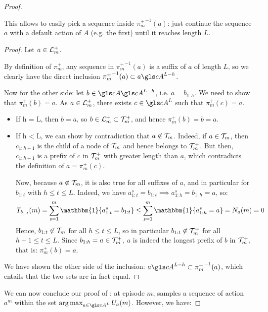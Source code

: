 \begin{subappendices}
\begin{proof}
\begin{lemma}
\begin{leftbar}[lemmabar]
		This allows to easily pick a sequence inside ${\pi_m^+}^{-1}(a)$: just continue the sequence $a$ with a default action of $A$ (e.g. the first) until it reaches length $L$.
		\end{leftbar}
	\end{lemma}
	\begin{proof}
		Let $a\in \mathcal{L}_m^+$. 
		
		By definition of $\pi_m^+$, any sequence in ${\pi_m^+}^{-1}(a)$ is a suffix of $a$ of length $L$, so we clearly have the direct inclusion ${\pi_m^+}^{-1}(a) \subset a \cA^{L-h}$.
		
		Now for the other side: let $b\in \cA \cA^{L-h}$, i.e. $a=b_{1:h}$. We need to show that $\pi_m^+(b) = a$.
		As $a\in \mathcal{L}_m^+$, there exists $c\in \cA^L$ such that $\pi_m^+(c) = a$.
		\begin{itemize}
			\item If h = L, then $b=a$, so $b \in \mathcal{L}_m^+ \subset \mathcal{T}_m^+$, and hence $\pi_m^+(b)=b=a$.
			\item If h < L, we can show by contradiction that $a \not \in \mathcal{T}_m$. Indeed, if $a \in \mathcal{T}_m$, then $c_{1:h+1}$ is the child of a node of $\mathcal{T}_m$ and hence belongs to $\mathcal{T}_m^+$. But then, $c_{1:h+1}$ is a prefix of $c$ in $\mathcal{T}_m^+$ with greater length than $a$, which contradicts the definition of $a = \pi_m^+(c)$.
			
			Now, because $a \not \in \mathcal{T}_m$, it is also true for all suffixes of $a$, and in particular for $b_{1:t}$ with $h \leq t \leq L$. Indeed, we have $a^s_{1:t} = b_{1:t} \implies a^s_{1:h} = b_{1:h} = a$, so:
			\begin{equation*}
			T_{b_{1:t}}(m) = \sum_{s=1}^m \mathbbm{1}\{a^s_{1:t} = b_{1:t}\} \leq \sum_{s=1}^m \mathbbm{1}\{a^s_{1:h} = a\} = N_a(m) = 0
			\end{equation*}
			Hence, $b_{1:t} \not \in \mathcal{T}_m$ for all $h \leq t \leq L$, so in particular $b_{1:t} \not \in \mathcal{T}_m^+$ for all $h+1 \leq t \leq L$. Since $b_{1:h} = a \in \mathcal{T}_m^+$, $a$ is indeed the longest prefix of $b$ in $\mathcal{T}_m^+$, that is: $\pi_m^+(b) = a$.
		\end{itemize}
		We have shown the other side of the inclusion: $a \cA^{L-h} \subset {\pi_m^+}^{-1}(a)$, which entails that the two sets are in fact equal.
	\end{proof}
	
	We can now conclude our proof of : at episode $m$, \KLOLOP samples a sequence of action $a^m$ within the set $\argmax_{a\in \cA^L} U_a(m)$. 
	However, we have:
	

\end{proof}
\end{subappendices}
